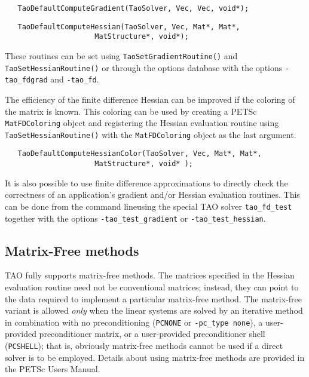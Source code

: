 \begin{verbatim}
   TaoDefaultComputeGradient(TaoSolver, Vec, Vec, void*);
\end{verbatim}


\begin{verbatim}
   TaoDefaultComputeHessian(TaoSolver, Vec, Mat*, Mat*, 
                     MatStructure*, void*);
\end{verbatim}
\noindent
These routines can be set using {\tt TaoSetGradientRoutine()} and 
{\tt TaoSetHessianRoutine()} or through the options database with the
options {\tt -tao\_fdgrad} and {\tt -tao\_fd}.

The efficiency of the finite difference Hessian can be improved if the
coloring of the matrix is known.  This coloring can be used by creating a
PETSc {\tt MatFDColoring} object and registering the Hessian evaluation routine 
using
{\tt TaoSetHessianRoutine()} with the {\tt MatFDColoring} object as
the last argument.
\begin{verbatim}
   TaoDefaultComputeHessianColor(TaoSolver, Vec, Mat*, Mat*, 
                     MatStructure*, void* );
\end{verbatim}

It is also possible to use finite difference approximations to directly check
the correctness of an application's gradient and/or Hessian evaluation routines.
This can be done from the command lineusing the special TAO solver 
{\tt tao\_fd\_test} together with the options
{\tt -tao\_test\_gradient} or {\tt -tao\_test\_hessian}.


\subsection{Matrix-Free methods}
TAO fully supports matrix-free methods. The matrices specified in the
Hessian evaluation routine need not be conventional
matrices; instead, they can point to the data required to implement a
particular matrix-free method.  The matrix-free variant is allowed
{\em only} when the linear systems are solved by an iterative method
in combination with no preconditioning ({\tt PCNONE} or {\tt -pc\_type none}),
a user-provided preconditioner matrix, or a user-provided preconditioner
shell ({\tt PCSHELL}); that is,
obviously matrix-free methods cannot be used if a direct solver is to 
be employed.  %
Details about using matrix-free methods are provided in the
PETSc  Users Manual.



